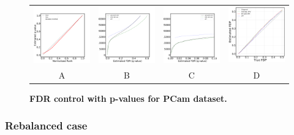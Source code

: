 \documentclass{article}
\begin{document}
\begin{figure}
	\advance\leftskip-0.5cm
	\begin{tabular}{cccc}
 		\includegraphics[width=1.7in]{img/pcam_QQ.pdf} &
		\includegraphics[width=1.7in]{img/pcam_fdr_control.pdf} & 
            \includegraphics[width=1.7in]{img/pcam_fdr_control_loc.pdf} &
            \includegraphics[width=1.7in]{img/cnn_FDPscat_pcam.pdf}
		\\	
		A & B & C & D
	\end{tabular}
	\caption{\bf FDR control with p-values for PCam dataset.}
	\label{fig:pcam}
\end{figure} 

\subsubsection{Rebalanced case}
\end{document}
